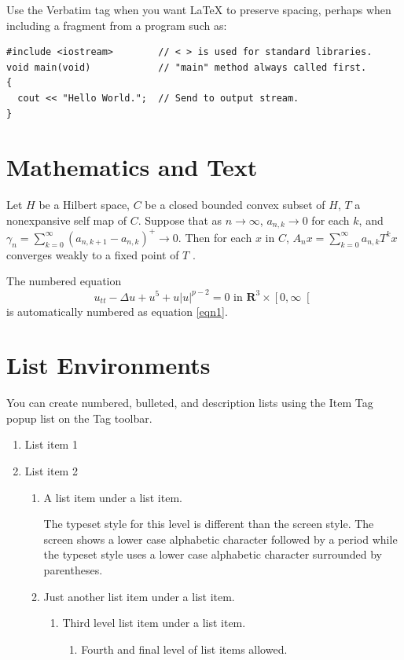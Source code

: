 \documentclass[aps,preprint]{revtex4}%
\begin{document}
Use the Verbatim tag when you want \LaTeX{} to preserve spacing, perhaps when
including a fragment from a program such as:
\begin{verbatim}
#include <iostream>        // < > is used for standard libraries.
void main(void)            // "main" method always called first.
{
  cout << "Hello World.";  // Send to output stream.
}
\end{verbatim}

\section{Mathematics and Text}

Let $H$ be a Hilbert space, $C$ be a closed bounded convex subset of $H$, $T$
a nonexpansive self map of $C$. Suppose that as $n\rightarrow\infty$,
$a_{n,k}\rightarrow0$ for each $k$, and $\gamma_{n}=\sum_{k=0}^{\infty}\left(
a_{n,k+1}-a_{n,k}\right)  ^{+}\rightarrow0$. Then for each $x$ in $C$,
$A_{n}x=\sum_{k=0}^{\infty}a_{n,k}T^{k}x$ converges weakly to a fixed point of
$T$ .

The numbered equation
\begin{equation}
u_{tt}-\Delta u+u^{5}+u\left|  u\right|  ^{p-2}=0\text{ in }\mathbf{R}%
^{3}\times\left[  0,\infty\right[ \label{eqn1}%
\end{equation}
is automatically numbered as equation \ref{eqn1}.

\section{List Environments}

You can create numbered, bulleted, and description lists using the Item Tag
popup list on the Tag toolbar.

\begin{enumerate}
\item List item 1

\item List item 2

\begin{enumerate}
\item A list item under a list item.

The typeset style for this level is different than the screen style. The
screen shows a lower case alphabetic character followed by a period while the
typeset style uses a lower case alphabetic character surrounded by parentheses.

\item Just another list item under a list item.

\begin{enumerate}
\item Third level list item under a list item.

\begin{enumerate}
\item Fourth and final level of list items allowed.
\end{enumerate}
\end{enumerate}
\end{enumerate}
\end{enumerate}
\end{document}
